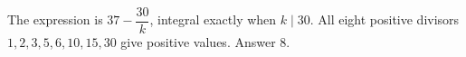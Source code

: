 The expression is $37-\dfrac{30}{k}$, integral exactly when $k\mid30$. All eight positive divisors $1,2,3,5,6,10,15,30$ give positive values. Answer $\boxed8$.
